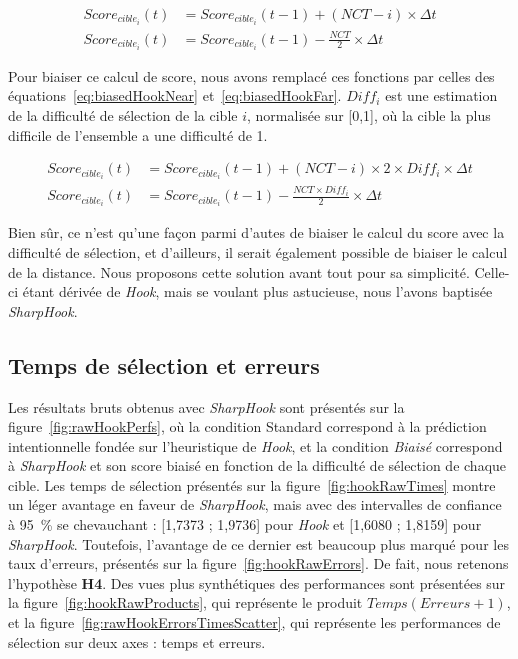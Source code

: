 	\begin{align}
		\label{eq:standardHookNear}
		Score_{cible_{i}}(t) &= Score_{cible_{i}}(t-1) + (NCT - i) \times \Delta{}t \\
		\label{eq:standardHookFar}
		Score_{cible_{i}}(t) &= Score_{cible_{i}}(t-1) - \frac{NCT}{2} \times \Delta{}t
	\end{align}
	
	Pour biaiser ce calcul de score, nous avons remplacé ces fonctions par celles des équations~\ref{eq:biasedHookNear} et~\ref{eq:biasedHookFar}. $Diff_{i}$ est une estimation de la difficulté de sélection de la cible $i$, normalisée sur [0,1], où la cible la plus difficile de l'ensemble a une difficulté de 1.

	\begin{align}
		\label{eq:biasedHookNear}
		Score_{cible_{i}}(t) &= Score_{cible_{i}}(t-1) + (NCT - i) \times 2 \times Diff_{i} \times \Delta{}t \\
		\label{eq:biasedHookFar}
		Score_{cible_{i}}(t) &= Score_{cible_{i}}(t-1) - \frac{NCT\times Diff_{i}}{2} \times \Delta{}t
	\end{align}
	
	Bien sûr, ce n'est qu'une façon parmi d'autes de biaiser le calcul du score avec la difficulté de sélection, et d'ailleurs, il serait également possible de biaiser le calcul de la distance. Nous proposons cette solution avant tout pour sa simplicité. Celle-ci étant dérivée de \emph{Hook}, mais se voulant plus astucieuse, nous l'avons baptisée \emph{SharpHook}.
	
	\subsection{Temps de sélection et erreurs}
	Les résultats bruts obtenus avec \emph{SharpHook} sont présentés sur la figure~\ref{fig:rawHookPerfs}, où la condition \og Standard \fg{} correspond à la prédiction intentionnelle fondée sur l'heuristique de \emph{Hook}, et la condition \emph{Biaisé} correspond à \emph{SharpHook} et son score biaisé en fonction de la difficulté de sélection de chaque cible. Les temps de sélection présentés sur la figure~\ref{fig:hookRawTimes} montre un léger avantage en faveur de \emph{SharpHook}, mais avec des intervalles de confiance à 95~\%{} se chevauchant : [1,7373 ; 1,9736] pour \emph{Hook} et [1,6080 ; 1,8159] pour \emph{SharpHook}. Toutefois, l'avantage de ce dernier est beaucoup plus marqué pour les taux d'erreurs, présentés sur la figure~\ref{fig:hookRawErrors}. De fait, nous retenons l'hypothèse \textbf{H4}. Des vues plus synthétiques des performances sont présentées sur la figure~\ref{fig:hookRawProducts}, qui représente le produit $Temps(Erreurs+1)$, et la figure~\ref{fig:rawHookErrorsTimesScatter}, qui représente les performances de sélection sur deux axes : temps et erreurs.
	

